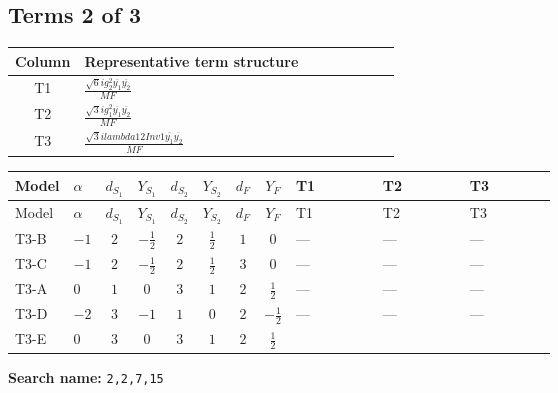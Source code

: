 \documentclass[8pt]{article}
\begin{document}
\begin{landscape}
\subsection*{Terms 2 of 3}
\begin{center}
\begin{tabular}{@{}c >{\raggedright\arraybackslash}p{0.82\linewidth}@{}}
\toprule
Column & Representative term structure \\
\midrule
T1 & \(\displaystyle \frac{\sqrt{6} i g_{2}^{2} \overline{y_{1}} \overline{y_{2}}}{MF}\) \\
\midrule
T2 & \(\displaystyle \frac{\sqrt{3} i g_{1}^{2} \overline{y_{1}} \overline{y_{2}}}{MF}\) \\
\midrule
T3 & \(\displaystyle \frac{\sqrt{3} i lambda12Inv1 \overline{y_{1}} \overline{y_{2}}}{MF}\) \\
\midrule
\bottomrule
\end{tabular}
\end{center}
\smallskip
\tiny
\begin{longtable}{@{}llcccccc >{\raggedright\arraybackslash}p{0.21\linewidth} >{\raggedright\arraybackslash}p{0.21\linewidth} >{\raggedright\arraybackslash}p{0.21\linewidth}@{}}
\toprule
Model & $\alpha$ & $d_{S_1}$ & $Y_{S_1}$ & $d_{S_2}$ & $Y_{S_2}$ & $d_F$ & $Y_F$ & T1 & T2 & T3 \\
\midrule
\endfirsthead
\toprule
Model & $\alpha$ & $d_{S_1}$ & $Y_{S_1}$ & $d_{S_2}$ & $Y_{S_2}$ & $d_F$ & $Y_F$ & T1 & T2 & T3 \\
\midrule
\endhead
T3-B & $-1$ & $2$ & $-\frac{1}{2}$ & $2$ & $\frac{1}{2}$ & $1$ & $0$ & --- & --- & --- \\
\midrule
T3-C & $-1$ & $2$ & $-\frac{1}{2}$ & $2$ & $\frac{1}{2}$ & $3$ & $0$ & --- & --- & --- \\
\midrule
T3-A & $0$ & $1$ & $0$ & $3$ & $1$ & $2$ & $\frac{1}{2}$ & --- & --- & --- \\
\midrule
T3-D & $-2$ & $3$ & $-1$ & $1$ & $0$ & $2$ & $-\frac{1}{2}$ & --- & --- & --- \\
\midrule
T3-E & $0$ & $3$ & $0$ & $3$ & $1$ & $2$ & $\frac{1}{2}$ & \scriptsize\adjustbox{max width=\linewidth}{$\begin{gathered} - \frac{\sqrt{6} i g_{2}^{2} \overline{y_{1}} \overline{y_{2}}}{3 MF}\end{gathered}$} & \scriptsize\adjustbox{max width=\linewidth}{$\begin{gathered} - \frac{\sqrt{3} i g_{1}^{2} \overline{y_{1}} \overline{y_{2}}}{8 MF}\end{gathered}$} & \scriptsize\adjustbox{max width=\linewidth}{$\begin{gathered} \frac{\sqrt{3} i lambda12Inv1 \overline{y_{1}} \overline{y_{2}}}{6 MF}\end{gathered}$} \\
\midrule
\bottomrule
\end{longtable}
\clearpage
\noindent\textbf{Search name: }\texttt{2,2,7,15}\par\smallskip

\end{landscape}
\end{document}
